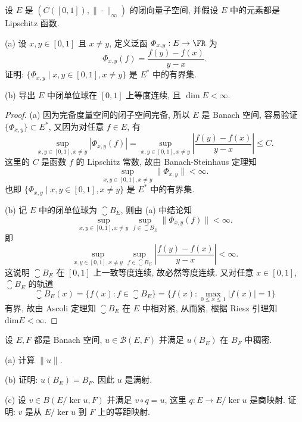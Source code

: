 \setcounter{exer}{7}
\begin{exercise}
    设 $E$ 是 $(C([0,1]),\|\cdot\|_{\infty})$ 的闭向量子空间, 并假设 $E$ 中的元素都是 Lipschitz 函数.

    (a) 设 $x,y\in [0,1]$ 且 $x\neq y$, 定义泛函 $\varPhi_{x,y}:E\to\FR$ 为
    \[\varPhi_{x,y}(f)=\frac{f(y)-f(x)}{y-x}.\]
    证明: $\{\varPhi_{x,y}\mid x,y\in [0,1],x\neq y\}$ 是 $E^*$ 中的有界集.

    (b) 导出 $E$ 中闭单位球在 $[0,1]$ 上等度连续, 且 $\dim E<\infty$.
\end{exercise}

\begin{proof}
    (a) 因为完备度量空间的闭子空间完备, 所以 $E$ 是 Banach 空间,
    容易验证 $\{\varPhi_{x,y}\}\subset E^*$, 又因为对任意 $f\in E$, 有
    \[\sup_{x,y\in[0,1],x\neq y}|\varPhi_{x,y}(f)|=\sup_{x,y\in[0,1],x\neq y}\left|\frac{f(y)-f(x)}{y-x}\right|\leq C.\]
    这里的 $C$ 是函数 $f$ 的 Lipschitz 常数, 故由 Banach-Steinhaus 定理知
    \[\sup_{x,y\in[0,1],x\neq y}\|\varPhi_{x,y}\|<\infty.\]
    也即 $\{\varPhi_{x,y}\mid x,y\in[0,1],x\neq y\}$ 是 $E^*$ 中的有界集.

    (b) 记 $E$ 中的闭单位球为 $\closure{B_E}$, 则由 (a) 中结论知
    \[\sup_{x,y\in[0,1],x\neq y}\sup_{f\in \closure{B_E}}\|\varPhi_{x,y}(f)\|<\infty.\]
    即
    \[\sup_{x,y\in[0,1],x\neq y}\sup_{f\in \closure{B_E}}\left|\frac{f(y)-f(x)}{y-x}\right|<\infty.\]
    这说明 $\closure{B_E}$ 在 $[0,1]$ 上一致等度连续, 故必然等度连续.
    又对任意 $x\in[0,1]$, $\closure{B_E}$ 的轨道
    \[\closure{B_E}(x)=\{f(x):f\in \closure{B_E}\}=\{f(x):\max_{0\leq x\leq 1}|f(x)|=1\}\]
    有界, 故由 Ascoli 定理知 $\closure{B_E}$ 在 $E$ 中相对紧, 从而紧, 根据 Riesz 引理知 $\textrm{dim}E<\infty$.
\end{proof}



\setcounter{exer}{9}
\begin{exercise}
    设 $E,F$ 都是 Banach 空间, $u\in\mathcal{B}(E,F)$ 并满足 $u(B_E)$ 在 $B_F$ 中稠密.

    (a) 计算 $\|u\|$.

    (b) 证明: $u(B_E)=B_F$. 因此 $u$ 是满射.

    (c) 设 $v\in B(E/\ker u,F)$ 并满足 $v\circ q=u$, 这里 $q:E\to E/\ker u$
    是商映射. 证明: $v$ 是从 $E/\ker u$ 到 $F$ 上的等距映射.
\end{exercise}

